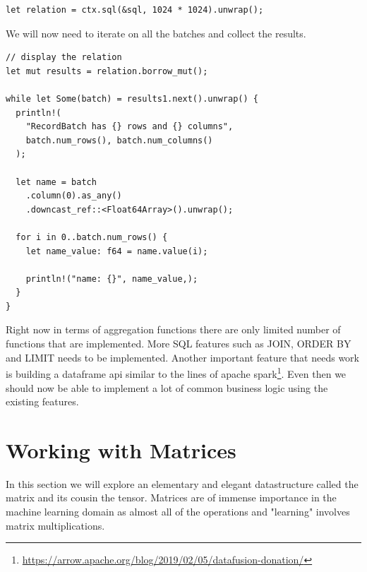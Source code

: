 \documentclass{book}
\begin{document}
\begin{lstlisting}[caption={chapter4\\/working\_with\_data\\/data\_transformations\_datafusion\\/src\\/main\\.rs},basicstyle=\small]
let relation = ctx.sql(&sql, 1024 * 1024).unwrap();
\end{lstlisting}

We will now need to iterate on all the batches and collect the results.

\begin{lstlisting}[caption={chapter4\\/working\_with\_data\\/data\_transformations\_datafusion\\/src\\/main\\.rs},basicstyle=\small]
// display the relation
let mut results = relation.borrow_mut();

while let Some(batch) = results1.next().unwrap() {
  println!(
    "RecordBatch has {} rows and {} columns",
    batch.num_rows(), batch.num_columns()
  );

  let name = batch
    .column(0).as_any()
    .downcast_ref::<Float64Array>().unwrap();

  for i in 0..batch.num_rows() {
    let name_value: f64 = name.value(i);

    println!("name: {}", name_value,);
  }
}
\end{lstlisting}

Right now in terms of aggregation functions there are only limited number of functions that are implemented. More SQL features such as JOIN, ORDER BY and LIMIT needs to be implemented. Another important feature that needs work is building a dataframe api similar to the lines of apache spark\footnote{\href{}{https://arrow.apache.org/blog/2019/02/05/datafusion-donation/}}. Even then we should now be able to implement a lot of common business logic using the existing features.

\label{sec:datafusion}

\section{Working with Matrices}%
In this section we will explore an elementary and elegant datastructure called the matrix and its cousin the tensor. Matrices are of immense importance in the machine learning domain as almost all of the operations and "learning" involves matrix multiplications.
\end{document}

